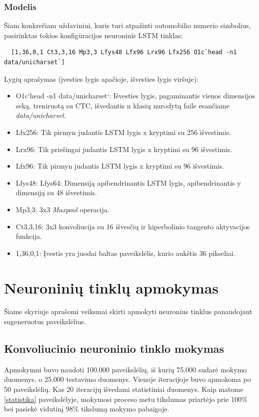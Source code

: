 \documentclass{VUMIFInfBakalaurinis}
\begin{document}
\subsubsection{Modelis}
Šiam konkrečiam uždaviniui, kuris turi atpažinti automobilio numerio simbolius, pasirinktas tokios konfigūracijos neuroninis LSTM tinklas:

\begin{verbatim}
  [1,36,0,1 Ct3,3,16 Mp3,3 Lfys48 Lfx96 Lrx96 Lfx256 O1c`head -n1 data/unicharset`]
\end{verbatim}

Lygių aprašymas (įvesties lygis apačioje, išvesties lygis viršuje):

\begin{itemize}
  \item O1c`head -n1 data/unicharset`: Išvesties lygis, pagaminantis vienos dimensijos seką, treniruotą su CTC, išvedantis n klasių nurodytų faile esančiame \textit{data/unicharset}.
  \item Lfx256: Tik pirmyn judantis LSTM lygis x kryptimi su 256 išvestimis.
  \item Lrx96: Tik priešingai judantis LSTM lygis x kryptimi su 96 išvestimis.
  \item Lfx96: Tik pirmyn judantis LSTM lygis x kryptimi su 96 išvestimis.
  \item Lfys48: Lfys64: Dimensiją apibendrinantis LSTM lygis, apibendrinantis y dimensiją su 48 išvestimis.
  \item Mp3,3: 3x3 \textit{Maxpool} operacija.
  \item Ct3,3,16: 3x3 konvoliucija su 16 išvesčių ir hiperbolinio tangento aktyvacijos funkcija.
  \item 1,36,0,1: Įvestis yra juodai baltas paveikslėlis, kurio aukštis 36 pikseliai.
\end{itemize}

\pagebreak
\section{Neuroninių tinklų apmokymas}
Šiame skyriuje aprašomi veiksmai skirti apmokyti neuronius tinklus panaudojant sugeneruotus paveikslėlius.

\subsection{Konvoliucinio neuroninio tinklo mokymas}
Apmokymui buvo naudoti 100.000 paveikslėlių, iš kurių 75.000 sudarė mokymo duomenys, o 25.000 testavimo duomenys.
Vienoje iteracijoje buvo apmokoma po 50 paveikslėlių. Kas 20 iteracijų išvedami statistiniai duomenys. Kaip matome \ref{statistika} paveikslėlyje,
mokymosi proceso metu tikslumas priartėjo prie 100\% bei pasiekė vidutinį 98\% tikslumą mokymo pabaigoje.
\end{document}
